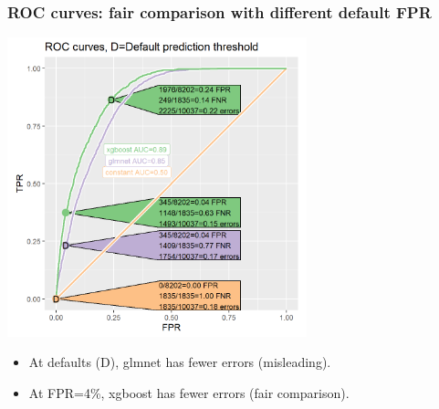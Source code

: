 \documentclass[t]{beamer}
\begin{document}
\begin{frame}
  \frametitle{ROC curves: fair comparison with different default FPR}

  \includegraphics[width=0.65\textwidth]{figure-batchtools-expired-earth-roc}

  \begin{itemize}
  \item At defaults (D), glmnet has fewer errors (misleading).
  \item At FPR=4\%, xgboost has fewer errors (fair comparison).
  \end{itemize}
\end{frame}
\end{document}
